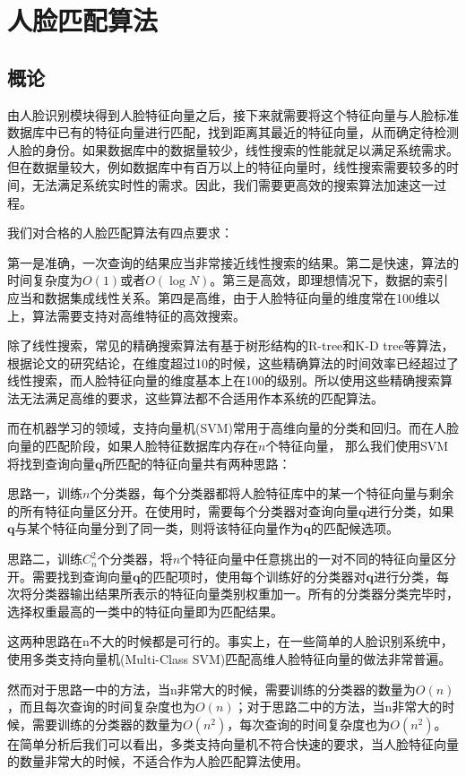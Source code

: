 \chapter{人脸匹配算法}

\section{概论}

由人脸识别模块得到人脸特征向量之后，接下来就需要将这个特征向量与人脸标准数据库中已有的特征向量进行匹配，找到距离其最近的特征向量，从而确定待检测人脸的身份。如果数据库中的数据量较少，线性搜索的性能就足以满足系统需求。但在数据量较大，例如数据库中有百万以上的特征向量时，线性搜索需要较多的时间，无法满足系统实时性的需求。因此，我们需要更高效的搜索算法加速这一过程。

我们对合格的人脸匹配算法有四点要求：

第一是准确，一次查询的结果应当非常接近线性搜索的结果。第二是快速，算法的时间复杂度为$O(1)$或者$O(\log{}N)$。第三是高效，即理想情况下，数据的索引应当和数据集成线性关系。第四是高维，由于人脸特征向量的维度常在100维以上，算法需要支持对高维特征的高效搜索。

除了线性搜索，常见的精确搜索算法有基于树形结构的R-tree和K-D tree等算法，根据论文\cite{weber1998quantitative}的研究结论，在维度超过10的时候，这些精确算法的时间效率已经超过了线性搜索，而人脸特征向量的维度基本上在100的级别。所以使用这些精确搜索算法无法满足高维的要求，这些算法都不合适用作本系统的匹配算法。

而在机器学习的领域，支持向量机(SVM)常用于高维向量的分类和回归。而在人脸向量的匹配阶段，如果人脸特征数据库内存在$n$个特征向量， 那么我们使用SVM将找到查询向量$\mathbf{q}$所匹配的特征向量共有两种思路：

思路一，训练$n$个分类器，每个分类器都将人脸特征库中的某一个特征向量与剩余的所有特征向量区分开。在使用时，需要每个分类器对查询向量$\mathbf{q}$进行分类，如果$\mathbf{q}$与某个特征向量分到了同一类，则将该特征向量作为$\mathbf{q}$的匹配候选项。

思路二，训练$C_n^2$个分类器，将$n$个特征向量中任意挑出的一对不同的特征向量区分开。需要找到查询向量$\mathbf{q}$的匹配项时，使用每个训练好的分类器对$\mathbf{q}$进行分类，每次将分类器输出结果所表示的特征向量类别权重加一。所有的分类器分类完毕时，选择权重最高的一类中的特征向量即为匹配结果。

这两种思路在n不大的时候都是可行的。事实上，在一些简单的人脸识别系统中，使用多类支持向量机(Multi-Class SVM)匹配高维人脸特征向量的做法非常普遍。

然而对于思路一中的方法，当n非常大的时候，需要训练的分类器的数量为$O(n)$，而且每次查询的时间复杂度也为$O(n)$；对于思路二中的方法，当n非常大的时候，需要训练的分类器的数量为$O(n^2)$，每次查询的时间复杂度也为$O(n^2)$。在简单分析后我们可以看出，多类支持向量机不符合快速的要求，当人脸特征向量的数量非常大的时候，不适合作为人脸匹配算法使用。

